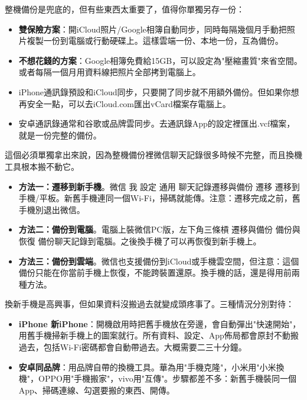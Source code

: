 
整機備份是兜底的，但有些東西太重要了，值得你單獨另存一份：


\begin{itemize}
  \item \textbf{雙保險方案}：開iCloud照片/Google相簿自動同步，同時每隔幾個月手動把照片複製一份到電腦或行動硬碟上。這樣雲端一份、本地一份，互為備份。
  \item \textbf{不想花錢的方案}：Google相簿免費給15GB，可以設定為"壓縮畫質"來省空間。或者每隔一個月用資料線把照片全部拷到電腦上。
\end{itemize}


\begin{itemize}
  \item iPhone通訊錄預設和iCloud同步，只要開了同步就不用額外備份。但如果你想再安全一點，可以去iCloud.com匯出vCard檔案存電腦上。
  \item 安卓通訊錄通常和谷歌或品牌雲同步。去通訊錄App的設定裡匯出.vcf檔案，就是一份完整的備份。
\end{itemize}


這個必須單獨拿出來說，因為整機備份裡微信聊天記錄很多時候不完整，而且換機工具根本搬不動它。

\begin{itemize}
  \item \textbf{方法一：遷移到新手機}。微信 我 設定 通用 聊天記錄遷移與備份 遷移 遷移到手機/平板。新舊手機連同一個Wi-Fi，掃碼就能傳。注意：遷移完成之前，舊手機別退出微信。
  \item \textbf{方法二：備份到電腦}。電腦上裝微信PC版，左下角三條槓 遷移與備份 備份與恢復 備份聊天記錄到電腦。之後換手機了可以再恢復到新手機上。
  \item \textbf{方法三：備份到雲端}。微信也支援備份到iCloud或手機雲空間，但注意：這個備份只能在你當前手機上恢復，不能跨裝置還原。換手機的話，還是得用前兩種方法。
\end{itemize}


換新手機是高興事，但如果資料沒搬過去就變成頭疼事了。三種情況分別對待：


\begin{itemize}
  \item \textbf{iPhone 新iPhone}：開機啟用時把舊手機放在旁邊，會自動彈出"快速開始"，用舊手機掃新手機上的圖案就行。所有資料、設定、App佈局都會原封不動搬過去，包括Wi-Fi密碼都會自動帶過去。大概需要二三十分鐘。
  \item \textbf{安卓同品牌}：用品牌自帶的換機工具。華為用"手機克隆"，小米用"小米換機"，OPPO用"手機搬家"，vivo用"互傳"。步驟都差不多：新舊手機裝同一個App、掃碼連線、勾選要搬的東西、開傳。
\end{itemize}

